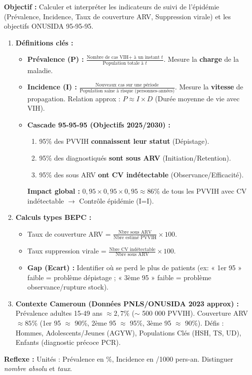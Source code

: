 \documentclass[11pt]{article}
\begin{document}
\begin{methode}
\textbf{Objectif :} Calculer et interpréter les indicateurs de suivi de l'épidémie (Prévalence, Incidence, Taux de couverture ARV, Suppression virale) et les objectifs ONUSIDA 95-95-95.
\begin{enumerate}
    \item \textbf{Définitions clés :}
    \begin{itemize}
        \item \textbf{Prévalence (P) :} $\frac{\text{Nombre de cas VIH+ à un instant } t}{\text{Population totale à } t}$. Mesure la \textbf{charge} de la maladie.
        \item \textbf{Incidence (I) :} $\frac{\text{Nouveaux cas sur une période}}{\text{Population saine à risque (personnes-années)}}$. Mesure la \textbf{vitesse} de propagation. Relation approx : $P \approx I \times D$ (Durée moyenne de vie avec VIH).
        \item \textbf{Cascade 95-95-95 (Objectifs 2025/2030) :}
        \begin{enumerate}
            \item 95\% des PVVIH \textbf{connaissent leur statut} (Dépistage).
            \item 95\% des diagnostiqués \textbf{sont sous ARV} (Initiation/Retention).
            \item 95\% des sous ARV \textbf{ont CV indétectable} (Observance/Efficacité).
        \end{enumerate}
        \textbf{Impact global :} $0,95 \times 0,95 \times 0,95 \approx 86\%$ de tous les PVVIH avec CV indétectable $\rightarrow$ Contrôle épidémie (I=I).
    \end{itemize}
    \item \textbf{Calculs types BEPC :}
    \begin{itemize}
        \item Taux de couverture ARV = $\frac{\text{Nbre sous ARV}}{\text{Nbre estimé PVVIH}} \times 100$.
        \item Taux suppression virale = $\frac{\text{Nbre CV indétectable}}{\text{Nbre sous ARV}} \times 100$.
        \item \textbf{Gap (Ecart) :} Identifier où se perd le plus de patients (ex: « 1er 95 » faible = problème dépistage ; « 3ème 95 » faible = problème observance/rupture stock).
    \end{itemize}
    \item \textbf{Contexte Cameroun (Données PNLS/ONUSIDA 2023 approx) :} Prévalence adultes 15-49 ans $\approx 2,7\%$ ($\sim$ 500 000 PVVIH). Couverture ARV $\approx 85\%$ (1er 95 $\approx$ 90\%, 2ème 95 $\approx$ 95\%, 3ème 95 $\approx$ 90\%). Défis : Hommes, Adolescents/Jeunes (AGYW), Populations Clés (HSH, TS, UD), Enfants (diagnostic précoce PCR).
\end{enumerate}
\textbf{Reflexe :} Unités : Prévalence en \%, Incidence en /1000 pers-an. Distinguer \emph{nombre absolu} et \emph{taux}.
\end{methode}
\end{document}

